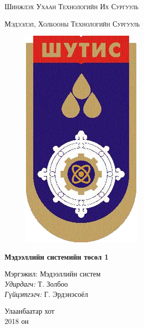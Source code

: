 \documentclass[12pt]{article}
\begin{document}
	\begin{titlepage}
		\begin{center}
			{\scshape\large Шинжлэх Ухаан Технологийн Их Сургууль\par} %
			{\scshape Мэдээлэл, Холбооны Технологийн Сургууль\par}\vspace{0.5cm} %
			
			\begin{figure}[!htbp]
				\centering
				\includegraphics[scale=0.2]{zurag/MUST_logo.png}
			\end{figure}
			
			\vspace{2cm}
			
			{\huge \bfseries Мэдээллийн системийн төсөл 1\par}\vspace{0.4cm} %
			
			\vspace{2cm}
			
			\begin{minipage}[t] {0.9\textwidth}
				\begin{flushleft} 
					\normalsize
					
					Мэргэжил: Мэдээллийн систем \\[2cm]
					
					\emph{Удирдагч:} {Т. Золбоо} \\%
					\emph{Гүйцэтгэгч:} {Г. Эрдэнэсоёл} \\ %
					
				\end{flushleft}
			\end{minipage}
			
			\vfill
			
			{\large  Улаанбаатар хот} \\
			{\large 2018 он}\\ %
		\end{center}
	\end{titlepage}
	
\end{document}
